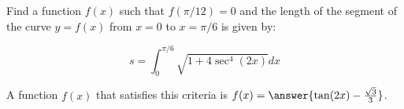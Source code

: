 \documentclass{ximera}
\author{Jim Talamo}
\begin{document}
\begin{exercise}

Find a function $f(x)$ such that $f(\pi/12)=0$ and the length of the segment of the curve $y=f(x)$ from $x=0$ to $x=\pi/6$ is given by:

\[
s= \int_0^{\pi/6} \sqrt{1+4\sec^4(2x)} dx
\]

A function $f(x)$ that satisfies this criteria is $f(x) = \answer{\tan(2x)-\frac{\sqrt{3}}{3}}$.

\end{exercise}
\end{document}
